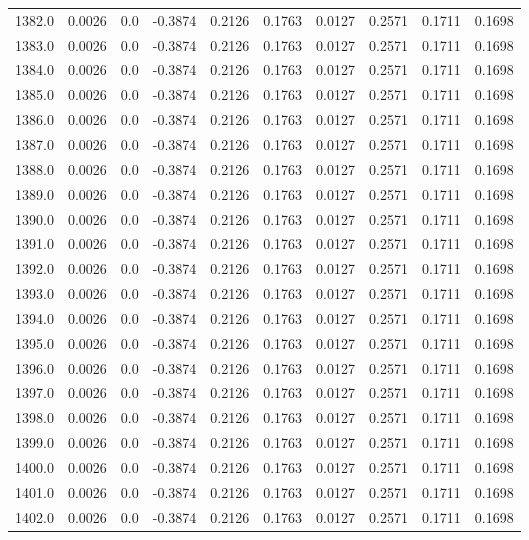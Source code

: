 \begin{longtable}{lrrrrrrrrr}
1382.0 & 0.0026 & 0.0 & -0.3874 & 0.2126 & 0.1763 & 0.0127 & 0.2571 & 0.1711 & 0.1698 \\
1383.0 & 0.0026 & 0.0 & -0.3874 & 0.2126 & 0.1763 & 0.0127 & 0.2571 & 0.1711 & 0.1698 \\
1384.0 & 0.0026 & 0.0 & -0.3874 & 0.2126 & 0.1763 & 0.0127 & 0.2571 & 0.1711 & 0.1698 \\
1385.0 & 0.0026 & 0.0 & -0.3874 & 0.2126 & 0.1763 & 0.0127 & 0.2571 & 0.1711 & 0.1698 \\
1386.0 & 0.0026 & 0.0 & -0.3874 & 0.2126 & 0.1763 & 0.0127 & 0.2571 & 0.1711 & 0.1698 \\
1387.0 & 0.0026 & 0.0 & -0.3874 & 0.2126 & 0.1763 & 0.0127 & 0.2571 & 0.1711 & 0.1698 \\
1388.0 & 0.0026 & 0.0 & -0.3874 & 0.2126 & 0.1763 & 0.0127 & 0.2571 & 0.1711 & 0.1698 \\
1389.0 & 0.0026 & 0.0 & -0.3874 & 0.2126 & 0.1763 & 0.0127 & 0.2571 & 0.1711 & 0.1698 \\
1390.0 & 0.0026 & 0.0 & -0.3874 & 0.2126 & 0.1763 & 0.0127 & 0.2571 & 0.1711 & 0.1698 \\
1391.0 & 0.0026 & 0.0 & -0.3874 & 0.2126 & 0.1763 & 0.0127 & 0.2571 & 0.1711 & 0.1698 \\
1392.0 & 0.0026 & 0.0 & -0.3874 & 0.2126 & 0.1763 & 0.0127 & 0.2571 & 0.1711 & 0.1698 \\
1393.0 & 0.0026 & 0.0 & -0.3874 & 0.2126 & 0.1763 & 0.0127 & 0.2571 & 0.1711 & 0.1698 \\
1394.0 & 0.0026 & 0.0 & -0.3874 & 0.2126 & 0.1763 & 0.0127 & 0.2571 & 0.1711 & 0.1698 \\
1395.0 & 0.0026 & 0.0 & -0.3874 & 0.2126 & 0.1763 & 0.0127 & 0.2571 & 0.1711 & 0.1698 \\
1396.0 & 0.0026 & 0.0 & -0.3874 & 0.2126 & 0.1763 & 0.0127 & 0.2571 & 0.1711 & 0.1698 \\
1397.0 & 0.0026 & 0.0 & -0.3874 & 0.2126 & 0.1763 & 0.0127 & 0.2571 & 0.1711 & 0.1698 \\
1398.0 & 0.0026 & 0.0 & -0.3874 & 0.2126 & 0.1763 & 0.0127 & 0.2571 & 0.1711 & 0.1698 \\
1399.0 & 0.0026 & 0.0 & -0.3874 & 0.2126 & 0.1763 & 0.0127 & 0.2571 & 0.1711 & 0.1698 \\
1400.0 & 0.0026 & 0.0 & -0.3874 & 0.2126 & 0.1763 & 0.0127 & 0.2571 & 0.1711 & 0.1698 \\
1401.0 & 0.0026 & 0.0 & -0.3874 & 0.2126 & 0.1763 & 0.0127 & 0.2571 & 0.1711 & 0.1698 \\
1402.0 & 0.0026 & 0.0 & -0.3874 & 0.2126 & 0.1763 & 0.0127 & 0.2571 & 0.1711 & 0.1698 \\

\end{longtable}
